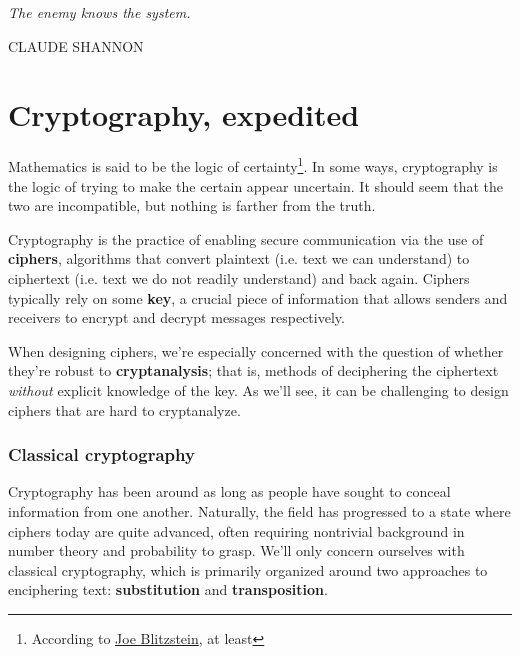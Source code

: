\documentclass{paper}
\newlength\longest
\begin{document}
\thispagestyle{empty}
\null\vfill

\settowidth{}

\begin{center}
    \parbox{\longest}{%
  \raggedright{\Large\itshape%
   The enemy knows the system. \par\bigskip
  }   
  \raggedleft\MakeUppercase{Claude Shannon}\par%
}

\end{center}


\vfill\vfill

\clearpage


\part{Cryptography, expedited}

Mathematics is said to be the logic of certainty\footnote{According to \href{https://twitter.com/stat110/status/288032140728365059?s=20}{Joe Blitzstein}, at least}. In some ways, cryptography is the logic of trying to make the certain appear uncertain. It should seem that the two are incompatible, but nothing is farther from the truth. 

\medskip

Cryptography is the practice of enabling secure communication via the use of \textbf{ciphers}, algorithms that convert plaintext (i.e. text we can understand) to ciphertext (i.e. text we do not readily understand) and back again. Ciphers typically rely on some \textbf{key}, a crucial piece of information that allows senders and receivers to encrypt and decrypt messages respectively.

\medskip
When designing ciphers, we're especially concerned with the question of whether they're robust to \textbf{cryptanalysis}; that is, methods of deciphering the ciphertext \textit{without} explicit knowledge of the key. As we'll see, it can be challenging to design ciphers that are hard to cryptanalyze.

\section{Classical cryptography}

Cryptography has been around as long as people have sought to conceal information from one another. Naturally, the field has progressed to a state where ciphers today are quite advanced, often requiring nontrivial background in number theory and probability to grasp. We'll only concern ourselves with classical cryptography, which is primarily organized around two approaches to enciphering text: \textbf{substitution} and \textbf{transposition}.
\end{document}
